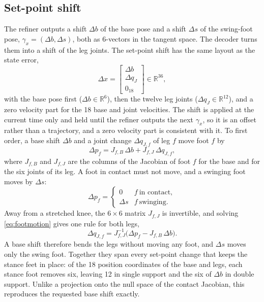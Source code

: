 \documentclass[conference]{IEEEtran}
\newcommand{\R}{\mathbb{R}}
\begin{document}
\subsection{Set-point shift}
The refiner outputs a shift $\Delta b$ of the base pose and a shift $\Delta s$ of the swing-foot pose, $\gamma_x=(\Delta b,\Delta s)$, both as 6-vectors in the tangent space.
The decoder turns them into a shift of the leg joints.
The set-point shift has the same layout as the state error,
\begin{equation}
\Delta x=\begin{bmatrix}\Delta b\\ \Delta q_J\\ 0_{18}\end{bmatrix}\in\R^{36},
\label{eq:setpoint}
\end{equation}
with the base pose first ($\Delta b\in\R^6$), then the twelve leg joints ($\Delta q_J\in\R^{12}$), and a zero velocity part for the 18 base and joint velocities.
The shift is applied at the current time only and held until the refiner outputs the next $\gamma_x$, so it is an offset rather than a trajectory, and a zero velocity part is consistent with it.
To first order, a base shift $\Delta b$ and a joint change $\Delta q_{J,f}$ of leg $f$ move foot $f$ by
\begin{equation}
\Delta p_f=J_{f,B}\,\Delta b+J_{f,J}\,\Delta q_{J,f},
\label{eq:footmotion}
\end{equation}
where $J_{f,B}$ and $J_{f,J}$ are the columns of the Jacobian of foot $f$ for the base and for the six joints of its leg.
A foot in contact must not move, and a swinging foot moves by $\Delta s$:
\begin{equation}
\Delta p_f=\begin{cases}0 & f\ \text{in contact},\\ \Delta s & f\ \text{swinging}.\end{cases}
\label{eq:footshift}
\end{equation}
Away from a stretched knee, the $6\times6$ matrix $J_{f,J}$ is invertible, and solving \eqref{eq:footmotion} gives one rule for both legs,
\begin{equation}
\Delta q_{J,f}=J_{f,J}^{-1}\big(\Delta p_f-J_{f,B}\,\Delta b\big).
\label{eq:legcompletion}
\end{equation}
A base shift therefore bends the legs without moving any foot, and $\Delta s$ moves only the swing foot.
Together they span every set-point change that keeps the stance feet in place: of the 18 position coordinates of the base and legs, each stance foot removes six, leaving 12 in single support and the six of $\Delta b$ in double support.
Unlike a projection onto the null space of the contact Jacobian, this reproduces the requested base shift exactly.
\end{document}
